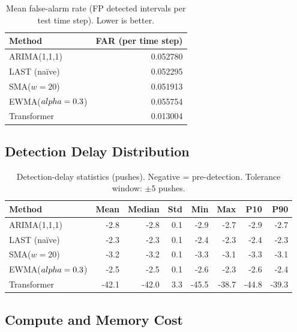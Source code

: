 \documentclass[11pt,a4paper]{article}
\begin{document}
\begin{table}[H]
\centering
\caption{Mean false-alarm rate (FP detected intervals per test time step).
  Lower is better.}
\label{tab:far}
\begin{tabular}{lr}
\toprule
Method & FAR (per time step) \\
\midrule
ARIMA(1,1,1) & 0.052780 \\
LAST (na\"ive) & 0.052295 \\
SMA($w=20$) & 0.051913 \\
EWMA($\\alpha=0.3$) & 0.055754 \\
Transformer & 0.013004 \\
\bottomrule
\end{tabular}
\end{table}


\subsection{Detection Delay Distribution}

\begin{table}[H]
\centering
\caption{Detection-delay statistics (pushes). Negative = pre-detection.
  Tolerance window: $\pm5$ pushes.}
\label{tab:delay}
\begin{tabular}{lrrrrrrr}
\toprule
Method & Mean & Median & Std & Min & Max & P10 & P90 \\
\midrule
ARIMA(1,1,1) & -2.8 & -2.8 & 0.1 & -2.9 & -2.7 & -2.9 & -2.7 \\
LAST (na\"ive) & -2.3 & -2.3 & 0.1 & -2.4 & -2.3 & -2.4 & -2.3 \\
SMA($w=20$) & -3.2 & -3.2 & 0.1 & -3.3 & -3.1 & -3.3 & -3.1 \\
EWMA($\\alpha=0.3$) & -2.5 & -2.5 & 0.1 & -2.6 & -2.3 & -2.6 & -2.4 \\
Transformer & -42.1 & -42.0 & 3.3 & -45.5 & -38.7 & -44.8 & -39.3 \\
\bottomrule
\end{tabular}
\end{table}


\subsection{Compute and Memory Cost}
\end{document}
